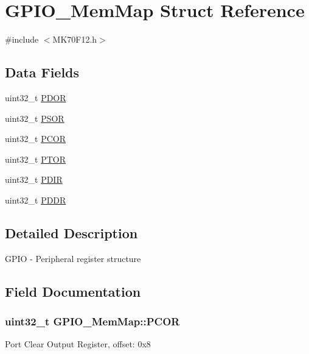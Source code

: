 \hypertarget{struct_g_p_i_o___mem_map}{}\section{G\+P\+I\+O\+\_\+\+Mem\+Map Struct Reference}
\label{struct_g_p_i_o___mem_map}


{\ttfamily \#include $<$M\+K70\+F12.\+h$>$}

\subsection*{Data Fields}
\begin{DoxyCompactItemize}
\item 
uint32\+\_\+t \hyperlink{struct_g_p_i_o___mem_map_aaf4f486952b9b4680e270ce6266122fd}{P\+D\+O\+R}
\item 
uint32\+\_\+t \hyperlink{struct_g_p_i_o___mem_map_a14833f065ec123137ccce5ab873b5879}{P\+S\+O\+R}
\item 
uint32\+\_\+t \hyperlink{struct_g_p_i_o___mem_map_a996f6a159415a5c0d0683346e950e7fb}{P\+C\+O\+R}
\item 
uint32\+\_\+t \hyperlink{struct_g_p_i_o___mem_map_a03faa882b5f4554ff4c11954c2d8759b}{P\+T\+O\+R}
\item 
uint32\+\_\+t \hyperlink{struct_g_p_i_o___mem_map_a01933bea5d005bf126ea2e0345518763}{P\+D\+I\+R}
\item 
uint32\+\_\+t \hyperlink{struct_g_p_i_o___mem_map_a49dfaa95d08fa9178dd7f098c87f562d}{P\+D\+D\+R}
\end{DoxyCompactItemize}


\subsection{Detailed Description}
G\+P\+I\+O -\/ Peripheral register structure 

\subsection{Field Documentation}
\hypertarget{struct_g_p_i_o___mem_map_a996f6a159415a5c0d0683346e950e7fb}{}
\subsubsection[{P\+C\+O\+R}]{\setlength{\rightskip}{0pt plus 5cm}uint32\+\_\+t G\+P\+I\+O\+\_\+\+Mem\+Map\+::\+P\+C\+O\+R}\label{struct_g_p_i_o___mem_map_a996f6a159415a5c0d0683346e950e7fb}
Port Clear Output Register, offset\+: 0x8 \hypertarget{struct_g_p_i_o___mem_map_a49dfaa95d08fa9178dd7f098c87f562d}{}
